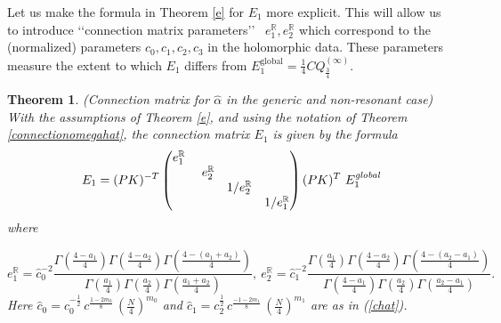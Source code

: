 \documentclass[a4paper,12pt,leqno]{amsart}
\numberwithin{equation}{section}
\theoremstyle{plain}
\newtheorem{theorem}{Theorem}[section]
\theoremstyle{definition}
\newcommand{\R}{\mathbb R}
\newcommand{\al}{\alpha}
\newcommand{\Ga}{\Gamma}
\renewcommand{\ll}{\lq\lq}
\newcommand{\rr}{\rq\rq\ }
\newcommand{\bp}{\begin{pmatrix}}
\newcommand{\ep}{\end{pmatrix}}
\newcommand{\Qi}{  Q^{(\infty)}  }
\newcommand{\nn}{m}
\begin{document}
Let us make the formula in Theorem \ref{e} for $E_1$ more explicit.  This will allow us to introduce \ll connection matrix parameters\rr 
$e^\R_1,e^\R_2$ which correspond to the (normalized) parameters $c_0,c_1,c_2,c_3$ in the holomorphic data.
These parameters measure the extent to which $E_1$ differs from $E_1^{\text{global}} = \tfrac14C \Qi_{\frac34}$.

\begin{theorem}\label{explicite}
{\em (Connection matrix for $\hat\al$ in the generic and non-resonant case)}
With the assumptions of Theorem \ref{e}, 
and using the notation of Theorem \ref{connectionomegahat},
the connection matrix $E_1$ is given by the formula 
\[
E_1=
(PK)^{-T}
\bp
e^\R_1\   & & & \\
  &e^\R_2 & & \\
  & & 1/e^\R_2& \\
  & & & 1/e^\R_1
  \ep
(PK)^{T}
  \ 
 E_1^{\text{\em{global}}}
\]
where

\[
e^\R_1=
\hat c_0^{-2}
\frac
{
\Ga(  \frac{4-a_1}{4})
\Ga(  \frac{4-a_2}{4})
\Ga(  \frac{4-(a_1+a_2)}{4})
}
{
\Ga(  \frac{a_1}{4})
\Ga(  \frac{a_2}{4})
\Ga(  \frac{a_1+a_2}{4})
},
\
e^\R_2= 
\hat c_1^{-2}
\frac
{
\Ga(  \frac{a_1}{4})
\Ga(  \frac{4-a_2}{4})
\Ga(  \frac{4-(a_2-a_1)}{4})
}
{
\Ga(  \frac{4-a_1}{4})
\Ga(  \frac{a_2}{4})
\Ga(  \frac{a_2-a_1}{4})
}.
\]
Here 
$\hat c_0= c_0^{-\frac12} \, c^{ \frac{1-2\nn_0}{8} }\, \left( \tfrac N4 \right)^{\nn_0}$ and
$\hat c_1= c_2^{\frac12} \, c^{ \frac{-1-2\nn_1}{8} }\, \left( \tfrac N4 \right)^{\nn_1}$
are as in (\ref{chat}).
\end{theorem}
\end{document}
